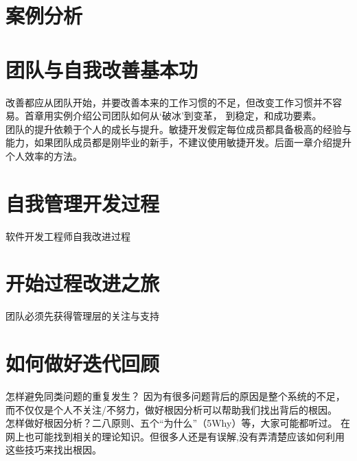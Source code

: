 \documentclass{book}        %
\begin{document}
\part{案例分析}



\part{团队与自我改善基本功}改善都应从团队开始，并要改善本来的工作习惯的不足，但改变工作习惯并不容易。首章用实例介绍公司团队如何从‘破冰’到变革， 到稳定，和成功要素。 \\
团队的提升依赖于个人的成长与提升。敏捷开发假定每位成员都具备极高的经验与能力，如果团队成员都是刚毕业的新手，不建议使用敏捷开发。后面一章介绍提升个人效率的方法。\\




\part{自我管理开发过程}软件开发工程师自我改进过程\\









\part{开始过程改进之旅}团队必须先获得管理层的关注与支持\\





\part{如何做好迭代回顾}怎样避免同类问题的重复发生？ 因为有很多问题背后的原因是整个系统的不足， 而不仅仅是个人不关注/不努力，做好根因分析可以帮助我们找出背后的根因。\\

怎样做好根因分析？二八原则、五个“为什么”（5Why）等，大家可能都听过。 在网上也可能找到相关的理论知识。但很多人还是有误解,没有弄清楚应该如何利用这些技巧来找出根因。\\
\end{document}
